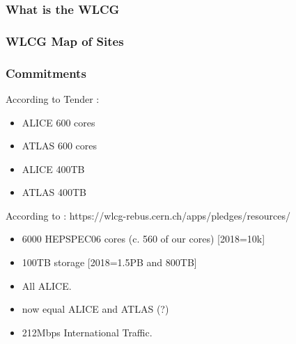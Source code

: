 \documentclass{beamer}
\begin{document}
\begin{frame}
\frametitle{What is the WLCG}
\end{frame}
\begin{frame}
\frametitle{WLCG Map of Sites}
\end{frame}

\begin{frame}
\frametitle{Commitments}
According to Tender :
\begin{itemize}
  \item ALICE 600 cores
  \item ATLAS 600 cores
  \item ALICE 400TB
  \item ATLAS 400TB
\end{itemize}
According to :
https://wlcg-rebus.cern.ch/apps/pledges/resources/
\begin{itemize}
    \item 6000 HEPSPEC06 cores (c. 560 of our cores) [2018=10k]
    \item 100TB storage [2018=1.5PB and 800TB]
  \item All ALICE.
  \item now equal ALICE and ATLAS (?)
  \item 212Mbps International Traffic.
\end{itemize}
\end{frame}
\end{document}
